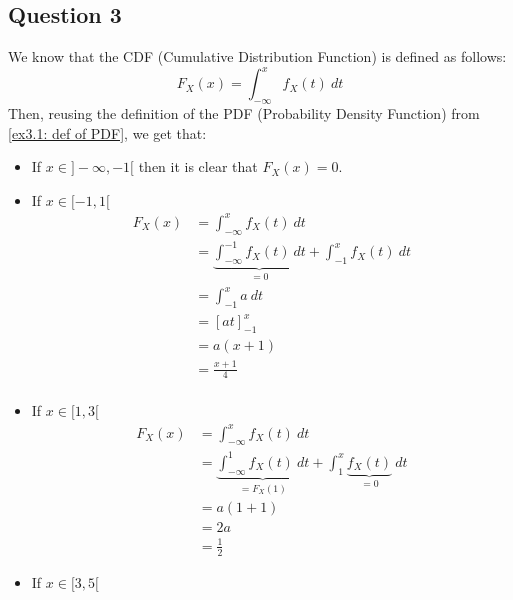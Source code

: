 \documentclass{article}
\begin{document}
\subsection{Question 3}
We know that the CDF (Cumulative Distribution Function) is defined as follows:
\[
    F_X(x) = \int_{-\infty}^{x} f_X(t) \ dt
\]
Then, reusing the definition of the PDF (Probability Density Function) from \eqref{ex3.1: def of PDF}, we get that:
\begin{itemize}
    \item If \(x \in ]-\infty, -1[\) then it is clear that \(F_X(x) = 0\).
    \item If \(x \in [-1, 1[\)
          \begin{align*}
              F_X(x)
               & = \int_{-\infty}^{x} f_X(t) \ dt                                                \\
               & = \underbrace{\int_{-\infty}^{-1} f_X(t) \ dt}_{=0} + \int_{-1}^{x} f_X(t) \ dt \\
               & = \int_{-1}^{x} a \ dt                                                          \\
               & = \left[ at \right]_{-1}^{x}                                                    \\
               & = a (x + 1)                                                                     \\
               & = \frac{x + 1}{4}                                                               \\
          \end{align*}
    \item If \(x \in [1, 3[\)
          \begin{align*}
              F_X(x)
               & = \int_{-\infty}^{x} f_X(t) \ dt                                                                     \\
               & = \underbrace{\int_{-\infty}^{1} f_X(t) \ dt}_{=F_X(1)} + \int_{1}^{x} \underbrace{f_X(t)}_{=0} \ dt \\
               & = a (1 + 1)                                                                                          \\
               & = 2a                                                                                                 \\
               & = \frac{1}{2}
          \end{align*}
    \item If \(x \in [3, 5[\)

\end{itemize}
\end{document}
